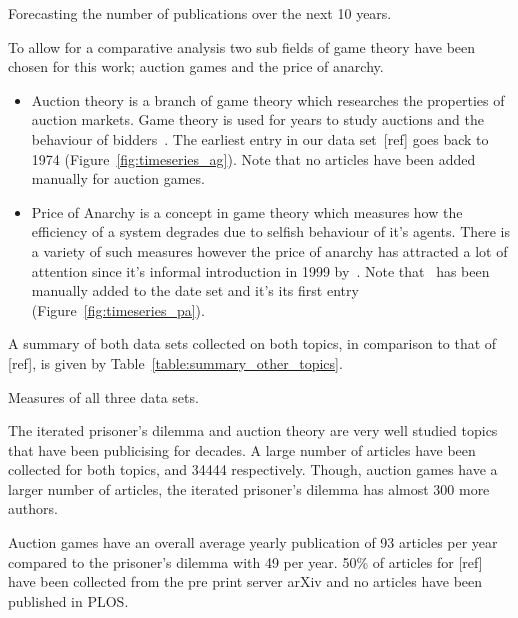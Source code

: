 \documentclass{article}
\theoremstyle{definition}
\newcommand{\totalarticles}{}
\begin{document}
\begin{table}[!hbtp]
    \begin{center}
    
    \end{center}
    \caption{Forecasting the number of publications over the next 10 years.}
    \label{table:forecast}
\end{table}

To allow for a comparative analysis two sub fields of game theory have been chosen
for this work; auction games and the price of anarchy.

\begin{itemize}
    \item Auction theory is a branch of game theory which researches the properties
    of auction markets.
    Game theory is used for years to study auctions and the behaviour of
    bidders~\cite{Shubik1971}. The earliest entry in our data set~[ref] goes
    back to 1974 (Figure~\ref{fig:timeseries_ag}). Note that no articles
    have been added manually for auction games.
    \item Price of Anarchy is a concept in game theory which
    measures how the efficiency of a system degrades due to selfish behaviour of
    it's agents. There is a variety of such measures however the price of anarchy
    has attracted a lot of attention since it's informal introduction in 1999
    by~\cite{Koutsoupias1999}. Note that~\cite{Koutsoupias1999} has been manually
    added to the date set and it's its first entry (Figure~\ref{fig:timeseries_pa}).
\end{itemize}

A summary of both data sets collected on both topics, in comparison to that of
[ref], is given by Table~\ref{table:summary_other_topics}.

\begin{table}[!hbtp]
    \centering
    \resizebox{\textwidth}{!}{
    }
    \caption{Measures of all three data sets.}\label{table:summary_other_topics}
\end{table}

The iterated prisoner's dilemma and auction theory are very well studied topics
that have been publicising for decades. A large number of articles have
been collected for both topics, \totalarticles and 34444 respectively. Though, auction
games have a larger number of articles, the iterated prisoner's dilemma
has almost 300 more authors.

Auction games have an overall average yearly publication
of 93 articles per year compared to the prisoner's dilemma with 49 per year. 50\% of articles
for [ref] have been collected from the pre print server arXiv and no articles have
been published in PLOS.
\end{document}
